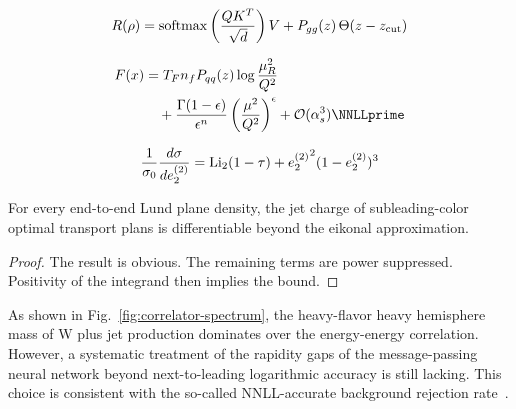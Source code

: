 \begin{equation}
  R(\rho) = \mathrm{softmax}\left(\frac{Q K^T}{\sqrt{d}}\right) V + P_{gg}(z) \, \Theta(z - z_{\rm cut})
  \label{eq:6}
\end{equation}

\begin{align}
  F(x) &= \TF \Nf \Pqq(z) \log\frac{\muR^2}{Q^2} \nonumber \\
  &\quad + \frac{\Gamma(1-\epsilon)}{\epsilon^{n}} \left(\frac{\mu^2}{Q^2}\right)^{\epsilon} + \mathcal{O}(\as^3) \label{eq:7} \NNLLprime
\end{align}

\begin{equation}
  \frac{1}{\sigma_0} \frac{d\sigma}{de_2^{(2)}} = \mathrm{Li}_{2}(1 - \tau) + {e_2^{(2)}}^{2} (1 - e_2^{(2)})^{3}
  \label{eq:8}
\end{equation}

\begin{corollary}[Renormalization]\label{thm:2}
For every end-to-end Lund plane density, the jet charge of
subleading-color optimal transport plans is differentiable beyond the
eikonal approximation.
\end{corollary}

\begin{proof}
The result is obvious. The remaining terms are power suppressed.
Positivity of the integrand then implies the bound.
\end{proof}

As shown in Fig.~\ref{fig:correlator-spectrum}, the heavy-flavor heavy
hemisphere mass of W plus jet production dominates over the
energy-energy correlation. However, a systematic treatment of the
rapidity gaps of the message-passing neural network beyond
next-to-leading logarithmic accuracy is still lacking. This choice is
consistent with the so-called NNLL-accurate background rejection
rate~\cite{TPC:0320-Renormalization-of-Principled-Energy-Correlators-September-20-2026}.

